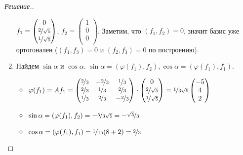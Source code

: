 \documentclass[a4paper]{article}
\theoremstyle{remark}
\begin{document}
\begin{proof}[Решение.]
\begin{enumerate}
                $f_1 = \begin{pmatrix}
                    0 \\
                    \nicefrac2{\sqrt{5}} \\
                    \nicefrac1{\sqrt{5}}\\
                \end{pmatrix}$, $f_2 = \begin{pmatrix}
                    1 \\
                    0 \\
                    0\\
                \end{pmatrix}$. Заметим, что $(f_1, f_2) = 0$, значит базис уже ортогонален 
                ($(f_1, f_3) = 0$ и $(f_2, f_3) = 0$ по построению).
                \item Найдем $\sin \alpha$ и $\cos \alpha$. $\sin \alpha = (\varphi(f_1), f_2), 
                \cos \alpha = (\varphi(f_1), f_1)$.
                \begin{itemize}
                    \item $\varphi(f_1) = Af_1 = 
                    \begin{pmatrix}
                        \nicefrac23 & -\nicefrac23 & \nicefrac13 \\
                        \nicefrac23 & \nicefrac13 & \nicefrac23 \\
                        \nicefrac13 & \nicefrac23 & -\nicefrac23 \\
                    \end{pmatrix} 
                    \cdot 
                    \begin{pmatrix}
                        0 \\
                        \nicefrac2{\sqrt{5}} \\
                        \nicefrac1{\sqrt{5}}\\
                    \end{pmatrix} = 
                    \nicefrac{1}{3\sqrt{5}}
                    \begin{pmatrix}
                        -5 \\
                        4 \\
                        2\\
                    \end{pmatrix}$
                    \item $\sin \alpha = (\varphi(f_1), f_2) = -\nicefrac{5}{3\sqrt{5}} = -\nicefrac{\sqrt{5}}{3}$
                    \item $\cos \alpha = (\varphi(f_1), f_1) = \nicefrac{1}{15}(8 + 2) = \nicefrac23$
                \end{itemize}


\end{enumerate}
\end{proof}
\end{document}
